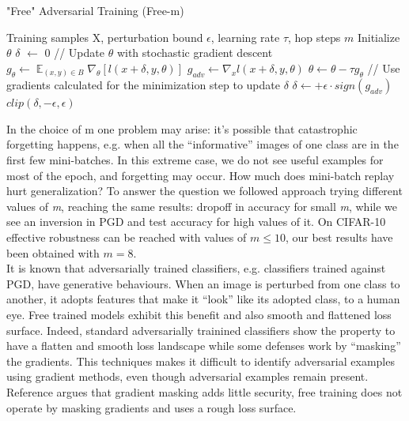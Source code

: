 \documentclass{article}
\DeclareMathOperator{\EX}{\mathbb{E}}%
\begin{document}
\begin{algorithm}[H]
	\caption{"Free" Adversarial Training (Free-m)}
	\begin{algorithmic}[1]
		\Require Training samples X, perturbation bound $\epsilon$, learning rate
		$\tau$, hop steps $m$ \State Initialize $\theta$ \State $\delta$
		$\leftarrow$ 0  
		 \State // Update $\theta$ with stochastic gradient descent
		\State $g_{\theta} \leftarrow \EX_{(x,y) \in B} \nabla_{\theta} [l(x+\delta,
		y, \theta)]$ \State $g_{adv} \leftarrow \nabla_{x} l(x+\delta, y, \theta)$
		\State $\theta \leftarrow \theta - \tau g_{\theta}$ \State // Use gradients
		calculated for the minimization step to update $\delta$ \State $\delta
		\leftarrow + \epsilon \cdot sign(g_{adv})$ \State $clip(\delta, -\epsilon,
		\epsilon)$ \EndFor \EndFor \EndFor
	\end{algorithmic}
\end{algorithm}
In the choice of m one problem may arise: it's possible that catastrophic
forgetting happens, e.g. when all the “informative” images of one class are in
the first few mini-batches. In this extreme case, we do not see useful examples
for most of the epoch, and forgetting may occur. How much does mini-batch replay
hurt generalization? To answer the question we followed \cite{ShafahiEtAl2019b}
approach trying different values of \textit{m}, reaching the same results: dropoff in
accuracy for small \textit{m}, while we see an inversion in PGD and test
accuracy for high values of it. On CIFAR-10 effective robustness can be reached
with values of $m \leq 10$, our best results have been obtained with $m = 8$.\\
It is known that adversarially trained classifiers, e.g. classifiers trained
against PGD,  have generative
behaviours. When an image is perturbed from one class to another, it adopts
features that make it “look” like its adopted class, to a human eye. Free
trained models exhibit this benefit and also smooth and flattened loss surface.
Indeed, standard adversarially trainined classifiers show the property to have a
flatten and smooth loss landscape while some defenses work by “masking” the
gradients. This techniques makes it difficult to identify adversarial examples
using gradient methods, even though adversarial examples remain present.
Reference \cite{EngstromEtAl2018} argues that gradient masking adds little
security, free training does not operate by masking gradients and uses a rough
loss surface.
\end{document}
